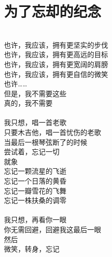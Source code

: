 \section{为了忘却的纪念}
\leftskip=25mm
\noindent \\
也许，我应该，拥有更坚实的步伐\\
也许，我应该，拥有更高远的目标\\
也许，我应该，拥有更宽阔的肩膀\\
也许，我应该，拥有更自信的微笑\\
也许……\\
但是，我不需要这些\\
真的，我不需要\\
\\
我只想，唱一首老歌\\
只要木吉他，唱一首忧伤的老歌\\
当最后一根琴弦断了的时候\\
尝试着，忘记一切\\
就象\\
忘记一颗流星的飞逝\\
忘记一个日落的黄昏\\
忘记一瓣雪花的飞舞\\
忘记一株扶桑的调零\\
\\
我只想，再看你一眼\\
你无需回避，回避我这最后一眼\\
然后\\
微笑，转身，忘记
